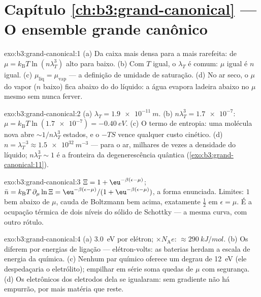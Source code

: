 \section*{Capítulo \ref{ch:b3:grand-canonical} --- O ensemble grande canônico}

\begin{solution}{exo:b3:grand-canonical:1}
(a) Da caixa mais densa para a mais rarefeita: de $\mu =
k_{\text{B}}T\ln(n\lambda_T^3)$ alto para baixo. (b) Com $T$ igual, o
$\lambda_T$ é comum: $\mu$ igual é $n$ igual. (c)
$\mu_{\text{liq}} = \mu_{\text{vap}}$ --- a definição de
umidade de saturação. (d) No ar seco, o $\mu$ do vapor ($n$ baixo)
fica abaixo do do líquido: a água evapora ladeira abaixo no $\mu$
mesmo sem nunca ferver.
\end{solution}

\begin{solution}{exo:b3:grand-canonical:2}
(a) $\lambda_T = \qty{1.9e-11}{m}$. (b) $n\lambda_T^3 =
\num{1.7e-7}$: $\mu = k_{\text{B}}T\ln(\num{1.7e-7}) =
\qty{-0.40}{eV}$. (c) O termo de entropia: uma molécula nova abre
$\sim1/n\lambda_T^3$ estados, e o $-TS$ vence qualquer custo cinético.
(d) $n = \lambda_T^{-3} \approx \qty{1.5e32}{m^{-3}}$ --- para o ar,
milhares de vezes a densidade do líquido; $n\lambda_T^3 \sim 1$
é a fronteira da degenerescência quântica
(\cref{exo:b3:grand-canonical:11}).
\end{solution}

\begin{solution}{exo:b3:grand-canonical:3}
$\Xi = 1 + \eu^{-\beta(\epsilon-\mu)}$; $\bar n = k_{\text{B}}T\,
\partial_\mu\ln\Xi = \eu^{-\beta(\epsilon-\mu)}/(1 +
\eu^{-\beta(\epsilon-\mu)})$, a forma enunciada. Limites: $1$ bem
abaixo de $\mu$, cauda de Boltzmann bem acima, exatamente $\tfrac12$ em
$\epsilon = \mu$. É a ocupação térmica de dois níveis do sólido de
Schottky --- a mesma curva, com outro rótulo.
\end{solution}

\begin{solution}{exo:b3:grand-canonical:4}
(a) \qty{3.0}{eV} por elétron; $\times N_{\text{A}}e$:
$\approx\qty{290}{kJ/mol}$. (b) Os  diferem por
energias de ligação --- elétron-volts: as baterias herdam a escala de
energia da química. (c) Nenhum par químico oferece um degrau de
\qty{12}{eV} (ele despedaçaria o eletrólito); empilhar em série soma
quedas de $\mu$ com segurança. (d) Os  eletrônicos
dos eletrodos dela se igualaram: sem gradiente não há empurrão, por
mais matéria que reste.
\end{solution}

